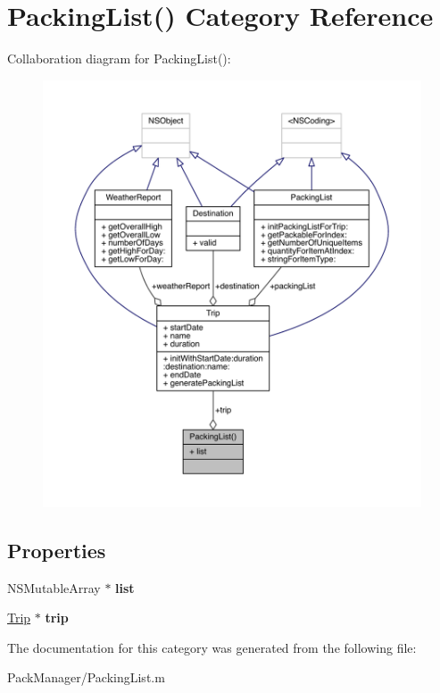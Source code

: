 \hypertarget{category_packing_list_07_08}{\section{Packing\-List() Category Reference}
\label{category_packing_list_07_08}
}


Collaboration diagram for Packing\-List()\-:\nopagebreak
\begin{figure}[H]
\begin{center}
\leavevmode
\includegraphics[width=350pt]{category_packing_list_07_08__coll__graph}
\end{center}
\end{figure}
\subsection*{Properties}
\begin{DoxyCompactItemize}
\item 
\hypertarget{category_packing_list_07_08_a292ad22790d68f0529063efcb9c043f4}{N\-S\-Mutable\-Array $\ast$ {\bfseries list}}\label{category_packing_list_07_08_a292ad22790d68f0529063efcb9c043f4}

\item 
\hypertarget{category_packing_list_07_08_a37b182ab8a91dce0cff8799c1c2a5c64}{\hyperlink{interface_trip}{Trip} $\ast$ {\bfseries trip}}\label{category_packing_list_07_08_a37b182ab8a91dce0cff8799c1c2a5c64}

\end{DoxyCompactItemize}


The documentation for this category was generated from the following file\-:\begin{DoxyCompactItemize}
\item 
Pack\-Manager/Packing\-List.\-m\end{DoxyCompactItemize}
